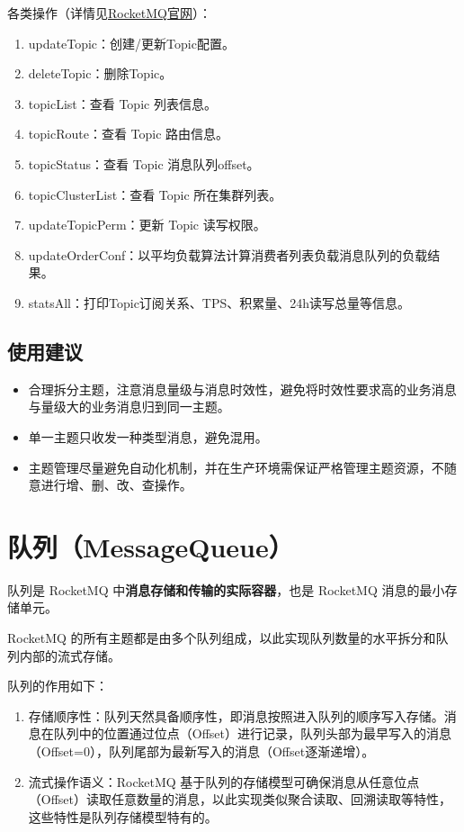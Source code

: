 \documentclass[11pt, a4paper, oneside, fontset=none]{ctexbook}
\begin{document}
各类操作（详情见\href{https://rocketmq.apache.org/zh/docs/deploymentOperations/02admintool}{RocketMQ官网}）：
\begin{enumerate}
  \item updateTopic：创建/更新Topic配置。
  \item deleteTopic：删除Topic。
  \item topicList：查看 Topic 列表信息。
  \item topicRoute：查看 Topic 路由信息。
  \item topicStatus：查看 Topic 消息队列offset。
  \item topicClusterList：查看 Topic 所在集群列表。
  \item updateTopicPerm：更新 Topic 读写权限。
  \item updateOrderConf：以平均负载算法计算消费者列表负载消息队列的负载结果。
  \item statsAll：打印Topic订阅关系、TPS、积累量、24h读写总量等信息。
\end{enumerate}

\subsection{使用建议}
\begin{itemize}
  \item 合理拆分主题，注意消息量级与消息时效性，避免将时效性要求高的业务消息与量级大的业务消息归到同一主题。
  \item 单一主题只收发一种类型消息，避免混用。
  \item 主题管理尽量避免自动化机制，并在生产环境需保证严格管理主题资源，不随意进行增、删、改、查操作。
\end{itemize}

\section{队列（MessageQueue）}
队列是 RocketMQ 中{\bfseries\kaishu 消息存储和传输的实际容器}，也是 RocketMQ 消息的最小存储单元。

RocketMQ 的所有主题都是由多个队列组成，以此实现队列数量的水平拆分和队列内部的流式存储。

队列的作用如下：
\begin{enumerate}
  \item 存储顺序性：队列天然具备顺序性，即消息按照进入队列的顺序写入存储。消息在队列中的位置通过位点（Offset）进行记录，队列头部为最早写入的消息（Offset=0），队列尾部为最新写入的消息（Offset逐渐递增）。
  \item 流式操作语义：RocketMQ 基于队列的存储模型可确保消息从任意位点（Offset）读取任意数量的消息，以此实现类似聚合读取、回溯读取等特性，这些特性是队列存储模型特有的。
\end{enumerate}
\end{document}
